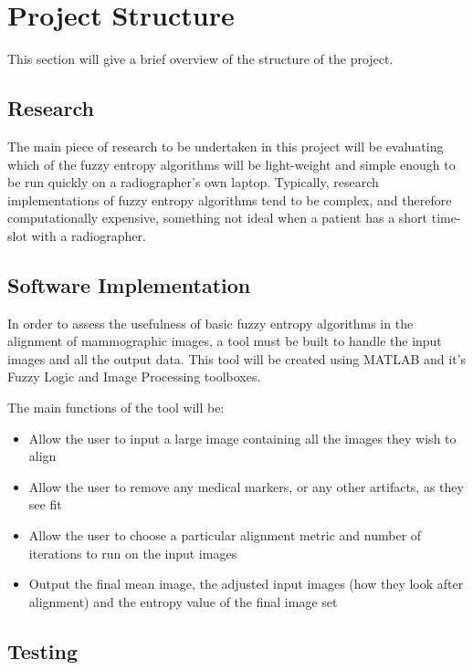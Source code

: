 \section{Project Structure}

This section will give a brief overview of the structure of the project.

\subsection{Research}

The main piece of research to be undertaken in this project will be evaluating which of the fuzzy entropy algorithms will be light-weight and simple enough to be run quickly on a radiographer's own laptop. Typically, research implementations of fuzzy entropy algorithms tend to be complex, and therefore computationally expensive, something not ideal when a patient has a short time-slot with a radiographer.

\subsection{Software Implementation}

In order to assess the usefulness of basic fuzzy entropy algorithms in the alignment of mammographic images, a tool must be built to handle the input images and all the output data. This tool will be created using MATLAB \cite{MATLAB:2016} and it's Fuzzy Logic \cite{fuzzy_toolbox} and Image Processing \cite{image_toolbox} toolboxes.

The main functions of the tool will be:

\begin{itemize}
  \item Allow the user to input a large image containing all the images they wish to align
  \item Allow the user to remove any medical markers, or any other artifacts, as they see fit
  \item Allow the user to choose a particular alignment metric and number of iterations to run on the input images
  \item Output the final mean image, the adjusted input images (how they look after alignment) and the entropy value of the final image set
\end{itemize}

\subsection{Testing}

